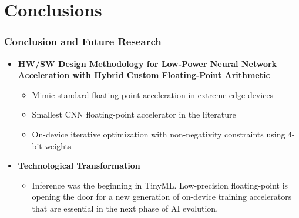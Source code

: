 \section{Conclusions}
\tableofcontents[currentsection]
\begin{frame}[t]
	\frametitle{Conclusion and Future Research}
	
	\begin{itemize} %
		\item \textbf{HW/SW Design Methodology for Low-Power Neural Network Acceleration with Hybrid Custom Floating-Point Arithmetic}
		\begin{itemize}
			\item<2-> Mimic standard floating-point acceleration in extreme edge devices
			\item<3-> Smallest CNN floating-point accelerator in the literature
			\item<4-> On-device iterative optimization with non-negativity constraints using 4-bit weights
		\end{itemize}
		\item \textbf{Technological Transformation}
		\begin{itemize}
			\item<5-> Inference was the beginning in TinyML. Low-precision floating-point is opening the door for a new generation of on-device training accelerators that are essential in the next phase of AI evolution.
		\end{itemize}
	\end{itemize}
\end{frame}
